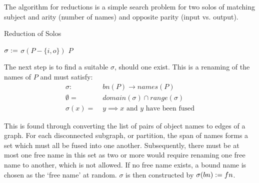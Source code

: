         The algorithm for reductions is a simple search problem for two solos of matching subject and arity (number of names) and opposite parity (input vs. output).
        \begin{breakablealgorithm}
            \caption{Reduction of Solos}
            \begin{algorithmic}[1]
                                \State$\sigma :=$ 
                                    \State\Return$\sigma(P - \{i, o\})$
                                \EndIf
                            \EndIf
                        \EndFor
                    \EndFor
                    \State\Return$P$
                \EndFunction
            \end{algorithmic}
        \end{breakablealgorithm}

        The next step is to find a suitable $\sigma$, should one exist. This is a renaming of the names of $P$ and must satisfy:
        \begin{align*}
            \sigma : \; & bn(P) \rightarrow names(P) \\
            \emptyset = \; & domain(\sigma) \cap range(\sigma) \\
            \sigma(x) = \; & y \implies \text{$x$ and $y$ have been fused}
        \end{align*}

        This is found through converting the list of pairs of object names to edges of a graph.
        For each disconnected subgraph, or partition, the span of names forms a set which must all be fused into one another.
        Subsequently, there must be at most one free name in this set as two or more would require renaming one free name to another, which is not allowed.
        If no free name exists, a bound name is chosen as the `free name' at random.
        $\sigma$ is then constructed by $\sigma(bn) := fn$.

